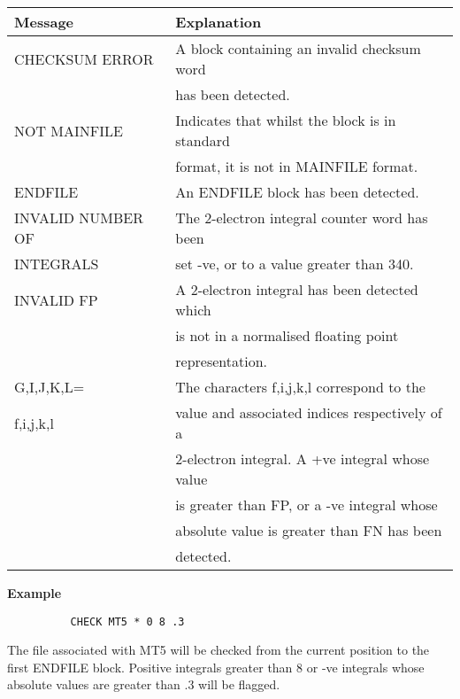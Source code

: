 \documentclass[11pt,fleqn]{article}
\begin{document}
\begin{centering}
\begin {tabular}{ll}
Message    &    Explanation \\  \hline\hline
CHECKSUM ERROR &   A block containing an invalid checksum word\\
             &        has been detected. \\

NOT MAINFILE &     Indicates that whilst the block is in standard \\
             &         format, it is not in MAINFILE format. \\
ENDFILE      &     An ENDFILE block has been detected. \\

INVALID NUMBER OF & The 2-electron integral counter word has been \\
INTEGRALS    &   set -ve, or to a value greater than 340. \\

INVALID FP   &     A 2-electron integral has been detected which \\
             &        is not in a normalised floating point \\
             &        representation. \\

G,I,J,K,L=   &     The characters f,i,j,k,l correspond to the \\
f,i,j,k,l    &     value and associated indices respectively of a \\
             &     2-electron integral. A +ve integral whose value \\
             &     is greater than FP, or a -ve integral whose \\
             &     absolute value is greater than FN has been \\
             &     detected. \\  \hline\hline
\end{tabular}
 
\end{centering}
\vspace{0.15in}
{\bf Example}
{
\footnotesize
\begin{verbatim}
          CHECK MT5 * 0 8 .3
\end{verbatim}
}
The file associated with MT5 will be checked from the current
position to the first ENDFILE block. Positive integrals greater than 8
or -ve integrals whose absolute values are greater than .3 will be
flagged.
\end{document}
